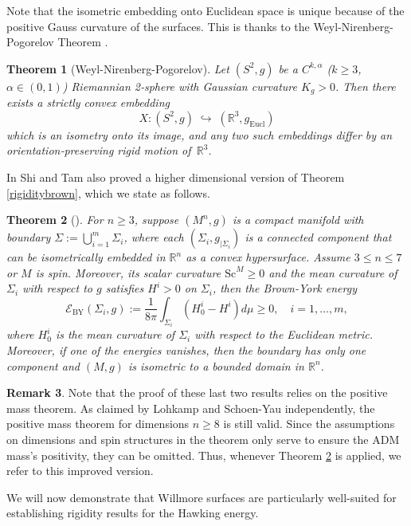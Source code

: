 \documentclass[12pt,a4paper]{amsart}
\theoremstyle{plain}
\newtheorem{theorem}{Theorem}[section]
\theoremstyle{definition}
\newtheorem{remark}[theorem]{Remark}
\begin{document}
  Note that the isometric embedding onto Euclidean space is unique because of the positive Gauss curvature of the surfaces. This is thanks to the Weyl-Nirenberg-Pogorelov Theorem  \cite{nirenberg1953weyl, pogorelov1972extrinsic}. 
\begin{theorem}[Weyl-Nirenberg-Pogorelov]\label{WeyNi}
Let $(S^2,g)$ be a $C^{k,\alpha}$ ($k\ge3$, $\alpha\in(0,1)$) Riemannian 2‐sphere with Gaussian curvature $K_g>0$.  Then there exists a strictly convex embedding
\[
X\colon (S^2,g)\;\hookrightarrow\;(\mathbb R^3,g_{\mathrm{Eucl}})
\]
which is an isometry onto its image, and any two such embeddings differ by an orientation‐preserving rigid motion of~$\mathbb R^3$.
\end{theorem}
In \cite{shi2002positive} Shi and Tam also proved a higher dimensional version of Theorem \ref{rigiditybrown}, which we state as follows.
\begin{theorem}[{\cite[Theorem 4.1]{shi2002positive}}]\label{highershitam}
    For \(n \geq 3\), suppose \((M^n, g)\) is a compact manifold with boundary \(\Sigma := \bigcup_{i=1}^m \Sigma_i\), where each \((\Sigma_i, g_{|\Sigma_i})\) is a connected component that can be isometrically embedded in \(\mathbb{R}^n\) as a convex hypersurface. Assume \(3 \leq n \leq 7\) or \(M\) is spin. Moreover, its scalar curvature $
\mathrm{Sc}^M \geq 0 $
and the mean curvature of \(\Sigma_i\) with respect to \(g\) satisfies $
H^i > 0$  on  $\Sigma_i$, then the Brown-York energy
\[
\mathcal{E}_{\text{BY}}(\Sigma_i, g) := \frac{1}{8 \pi }\int_{\Sigma_i} \left(H^i_0 - H^i \right) d\mu \geq 0, \quad i = 1, \dots, m,
\]
where \(H^i_0\) is the mean curvature of \(\Sigma_i\) with respect to the Euclidean metric. Moreover, if one of the energies vanishes, then the boundary has only one component and \((M, g)\) is isometric to a bounded domain in \(\mathbb{R}^n\).
\end{theorem}
\begin{remark}\label{ramarkhierdim} 
Note that the proof of these last two results relies on the positive mass theorem. As claimed by Lohkamp \cite{lohkamp2016higher1, lohkamp2016higher2} and Schoen-Yau \cite{schoen2017positive} independently, the positive mass theorem for dimensions \(n \geq 8\)  is still valid. 
Since the assumptions on dimensions and spin structures in the theorem only serve to ensure the ADM mass’s positivity, they can be omitted. Thus, whenever Theorem \ref{highershitam} is applied, we refer to this improved version. 
\end{remark}
We will now demonstrate that Willmore surfaces are particularly well-suited for establishing rigidity results for the Hawking energy. 
\end{document}

